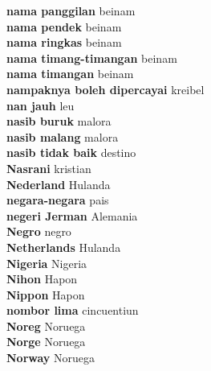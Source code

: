 \textbf{ nama panggilan  } beinam \\
\textbf{ nama pendek  } beinam \\
\textbf{ nama ringkas  } beinam \\
\textbf{ nama timang-timangan  } beinam \\
\textbf{ nama timangan  } beinam \\
\textbf{ nampaknya boleh dipercayai  } kreibel \\
\textbf{ nan jauh  } leu \\
\textbf{ nasib buruk  } malora \\
\textbf{ nasib malang  } malora \\
\textbf{ nasib tidak baik  } destino \\
\textbf{ Nasrani  } kristian \\
\textbf{ Nederland  } Hulanda \\
\textbf{ negara-negara  } pais \\
\textbf{ negeri Jerman  } Alemania \\
\textbf{ Negro  } negro \\
\textbf{ Netherlands  } Hulanda \\
\textbf{ Nigeria  } Nigeria \\
\textbf{ Nihon  } Hapon \\
\textbf{ Nippon  } Hapon \\
\textbf{ nombor lima  } cincuentiun \\
\textbf{ Noreg  } Noruega \\
\textbf{ Norge  } Noruega \\
\textbf{ Norway  } Noruega \\
